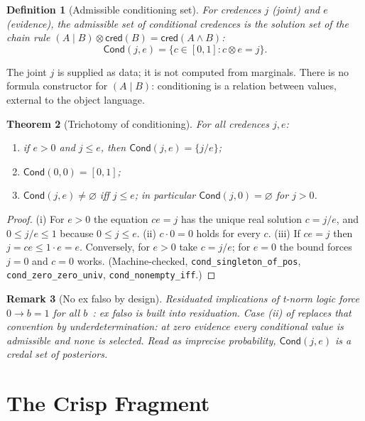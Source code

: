 \documentclass[11pt,a4paper]{article}
\newtheorem{theorem}{Theorem}[section]
\newtheorem{definition}[theorem]{Definition}
\newtheorem{remark}[theorem]{Remark}
\newcommand{\cred}{\mathsf{cred}}
\newcommand{\conjc}{\otimes}
\newcommand{\Cond}{\mathsf{Cond}}
\newcommand{\condc}[2]{({#1} \mid {#2})}
\begin{document}
\begin{definition}[Admissible conditioning set]
\label{def:cond}
For credences $j$ (joint) and $e$ (evidence), the \emph{admissible set}
of conditional credences is the solution set of the chain rule
$\condc{A}{B} \conjc \cred(B) = \cred(A \wedge B)$:
\[
  \Cond(j, e) = \{c \in [0,1] : c \conjc e = j\}.
\]
\end{definition}

The joint $j$ is supplied as data; it is not computed from marginals.
There is no formula constructor for $\condc{A}{B}$: conditioning is a
relation between values, external to the object language.

\begin{theorem}[Trichotomy of conditioning]
\label{thm:cond-trichotomy}
For all credences $j, e$:
\begin{enumerate}[label=\textup{(\roman*)},nosep]
\item if $e > 0$ and $j \leq e$, then $\Cond(j,e) = \{j/e\}$;
\item $\Cond(0,0) = [0,1]$;
\item $\Cond(j,e) \neq \varnothing$ iff $j \leq e$; in particular
  $\Cond(j,0) = \varnothing$ for $j > 0$.
\end{enumerate}
\end{theorem}
\begin{proof}
(i) For $e > 0$ the equation $ce = j$ has the unique real solution
$c = j/e$, and $0 \leq j/e \leq 1$ because $0 \leq j \leq e$.
(ii) $c \cdot 0 = 0$ holds for every $c$.
(iii) If $ce = j$ then $j = ce \leq 1 \cdot e = e$.
Conversely, for $e > 0$ take $c = j/e$; for $e = 0$ the bound forces
$j = 0$ and $c = 0$ works.
(Machine-checked, \texttt{cond\_singleton\_of\_pos},
\texttt{cond\_zero\_zero\_univ}, \texttt{cond\_nonempty\_iff}.)
\end{proof}

\begin{remark}[No ex falso by design]
\label{rem:no-ex-falso-design}
Residuated implications of t-norm logic force $0 \to b = 1$ for all
$b$~\cite{hajek1998}: ex falso is built into residuation.
Case (ii) of  replaces that convention by
underdetermination: at zero evidence every conditional value is
admissible and none is selected.
Read as imprecise probability, $\Cond(j,e)$ is a credal set of
posteriors.
\end{remark}

\section{The Crisp Fragment}
\label{sec:crisp}
\end{document}
